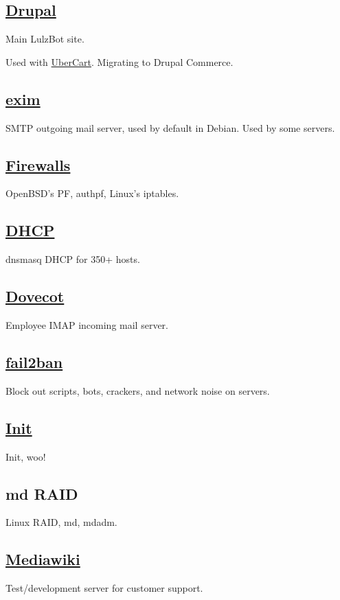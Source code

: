 \subsection{\href{http://www.drupal.org}{Drupal}}
Main LulzBot site.

Used with \href{http://www.ubercart.org/}{UberCart}.
Migrating to Drupal Commerce.

\subsection{\href{http://www.exim.org/}{exim}}
SMTP outgoing mail server, used by default in Debian. Used by some servers.

\subsection{\href{http://www.openbsd.org/faq/pf/}{Firewalls}}
OpenBSD's PF, authpf, Linux's iptables.

\subsection{\href{http://dnsmasq.org/}{DHCP}}
dnsmasq DHCP for 350+ hosts.

\subsection{\href{http://dovecot.org/}{Dovecot}}
Employee IMAP incoming mail server.

\subsection{\href{http://www.fail2ban.org/}{fail2ban}}
Block out scripts, bots, crackers, and network noise on servers.

\subsection{\href{http://www.debian.org/}{Init}}
Init, woo!

\subsection{md RAID}
Linux RAID, md, mdadm.

\subsection{\href{http://www.mediawiki.org/}{Mediawiki}}
Test/development server for customer support.

